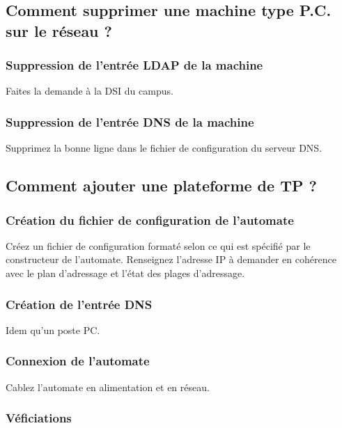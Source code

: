 \documentclass[a4paper]{article}
\begin{document}
\subsection{Comment supprimer une machine type P.C. sur le réseau ?}

\subsubsection{Suppression de l'entrée LDAP de la machine}

Faites la demande à la DSI du campus.

\subsubsection{Suppression de l'entrée DNS de la machine}

Supprimez la bonne ligne dans le fichier de configuration du serveur DNS.

\subsection{Comment ajouter une plateforme de TP  ?}

\subsubsection{Création du fichier de configuration de l'automate}

Créez un fichier de configuration formaté selon ce qui est spécifié par le constructeur de l'automate.
Renseignez l'adresse IP à demander en cohérence avec le plan d'adressage et l'état des plages d'adressage.

\subsubsection{Création de l'entrée DNS}

Idem qu'un poste PC.

\subsubsection{Connexion de l'automate}

Cablez l'automate en alimentation et en réseau.

\subsubsection{Véficiations}
\end{document}
